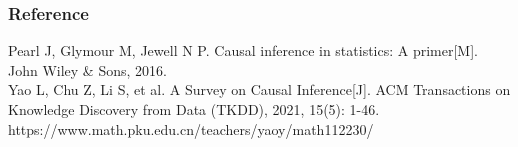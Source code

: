 \documentclass{beamer}
\begin{document}











\begin{frame}
    \frametitle{Reference} 
    Pearl J, Glymour M, Jewell N P. Causal inference in statistics: A primer[M]. John Wiley \& Sons, 2016. \\
    Yao L, Chu Z, Li S, et al. A Survey on Causal Inference[J]. ACM Transactions on
    Knowledge Discovery from Data (TKDD), 2021, 15(5): 1-46. \\
    https://www.math.pku.edu.cn/teachers/yaoy/math112230/ \\
\end{frame}
\end{document}
